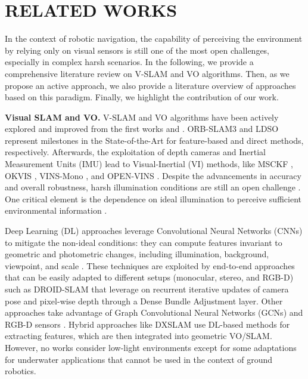 \section{RELATED WORKS}
\label{sec:related_works}
In the context of robotic navigation, the capability of perceiving the environment by relying only on visual sensors is still one of the most open challenges, especially in complex harsh scenarios.
In the following, we provide a comprehensive literature review on V-SLAM and VO algorithms.
Then, as we propose an active approach, we also provide a literature overview of approaches based on this paradigm. 
Finally, we highlight the contribution of our work.



\textbf{Visual SLAM and VO.} 
V-SLAM and VO algorithms have been actively explored and improved from the first works \cite{davison2007monoslam} and \cite{nister2004visual}. ORB-SLAM3 \cite{ORBSLAM3_TRO} and LDSO \cite{gao2018ldso} represent milestones in the State-of-the-Art for feature-based and direct methods, respectively. Afterwards, the exploitation of depth cameras and Inertial Measurement Units (IMU) lead to Visual-Inertial (VI) methods, like MSCKF \cite{mourikis2007multi}, OKVIS \cite{leutenegger2015keyframe}, VINS-Mono \cite{qin2018vins}, and OPEN-VINS \cite{geneva2020openvins}. 
Despite the advancements in accuracy and overall robustness, harsh illumination conditions are still an open challenge \cite{bujanca2021robust}. One critical element is the dependence on ideal illumination to perceive sufficient environmental information \cite{park2017illumination}. 

Deep Learning (DL) approaches leverage Convolutional Neural Networks (CNNs) to mitigate the non-ideal conditions: they can compute features invariant to geometric and photometric changes, including illumination, background, viewpoint, and scale \cite{wang2020approaches}. These techniques are exploited by end-to-end approaches that can be easily adapted
to different setups (monocular, stereo, and RGB-D) such as DROID-SLAM \cite{teed2021droid} that leverage on recurrent iterative updates of camera pose and pixel-wise depth through a Dense Bundle Adjustment layer. Other approaches take advantage of Graph Convolutional Neural Networks (GCNs)  and RGB-D sensors \cite{derr2018signed}. Hybrid approaches like DXSLAM \cite{li2020dxslam} use DL-based methods for extracting features, which are then integrated into geometric VO/SLAM. 
However, no works consider low-light environments except for some adaptations for underwater applications \cite{zhang2022visual} that cannot be used in the context of ground robotics.


